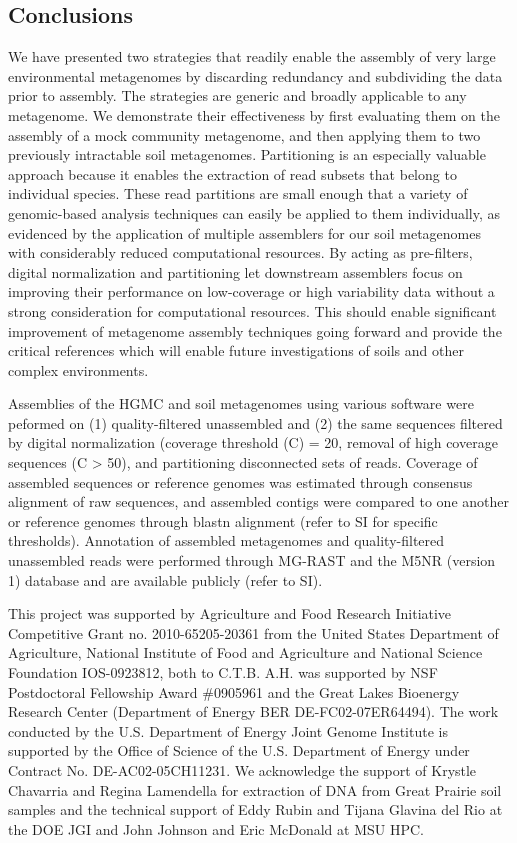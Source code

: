 \documentclass{pnastwo}
\begin{document}
\begin{article}
\subsection{Conclusions}
We have presented two strategies that readily enable the assembly of very large
environmental metagenomes by discarding redundancy and subdividing the data
prior to assembly. The strategies are generic and broadly applicable to any
metagenome. We demonstrate their effectiveness by first evaluating them on the
assembly of a mock community metagenome, and then applying them to two
previously intractable soil metagenomes. Partitioning is an especially valuable
approach because it enables the extraction of read subsets that belong to
individual species. These read partitions are small enough that a variety of
genomic-based analysis techniques can easily be 
applied to them individually, as evidenced by the application of multiple assemblers for our soil metagenomes with considerably reduced 
computational resources. By acting as
pre-filters, digital normalization and partitioning let downstream assemblers 
focus on improving their performance on low-coverage or high variability data
without a strong consideration for computational resources. This should enable
significant improvement of metagenome assembly techniques going forward and
provide the critical references which will enable future investigations of soils
and other complex environments. \begin{materials} Assemblies of the HGMC and
soil metagenomes using various software were peformed on (1) quality-filtered
unassembled and (2) the same sequences filtered by digital normalization
(coverage threshold (C) = 20, removal of high coverage sequences (C > 50), and partitioning disconnected sets
of reads. Coverage of assembled sequences or reference genomes was estimated
through consensus alignment of raw sequences, and assembled contigs were
compared to one another or reference genomes through blastn alignment (refer to
SI for specific thresholds). Annotation of assembled metagenomes and
quality-filtered unassembled reads were performed through MG-RAST and the M5NR
(version 1) database and are available publicly (refer to SI). \end{materials}


\begin{acknowledgments} This project was supported by Agriculture and Food
Research Initiative Competitive Grant no. 2010-65205-20361 from the United
States Department of Agriculture, National Institute of Food and Agriculture and
National Science Foundation IOS-0923812, both to C.T.B. A.H. was supported by
NSF Postdoctoral Fellowship Award \#0905961 and the Great Lakes Bioenergy
Research Center (Department of Energy BER DE-FC02-07ER64494). The work conducted
by the U.S. Department of Energy Joint Genome Institute is supported by the
Office of Science of the U.S. Department of Energy under Contract No.
DE-AC02-05CH11231. We acknowledge the support of Krystle Chavarria and Regina
Lamendella for extraction of DNA from Great Prairie soil samples and the
technical support of Eddy Rubin and Tijana Glavina del Rio at the DOE JGI and
John Johnson and Eric McDonald at MSU HPC. \end{acknowledgments}



\end{article}
\end{document}
